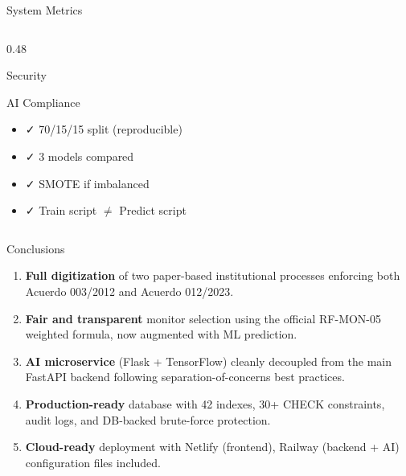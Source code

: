 \documentclass[aspectratio=169,12pt]{beamer}
\begin{document}
\begin{frame}{System Metrics}
\begin{columns}[T]
\begin{column}{0.48\textwidth}
\begin{block}{Security}
\begin{itemize}
        \end{itemize}
      \end{block}
      \vspace{0.2cm}
      \begin{block}{AI Compliance}
        \footnotesize
        \begin{itemize}
          \item ✓ 70/15/15 split (reproducible)
          \item ✓ 3 models compared
          \item ✓ SMOTE if imbalanced
          \item ✓ Train script $\neq$ Predict script
        \end{itemize}
      \end{block}
    \end{column}
  \end{columns}
\end{frame}

\begin{frame}{Conclusions}
  \begin{enumerate}
    \item \textbf{Full digitization} of two paper-based institutional processes enforcing both Acuerdo 003/2012 and Acuerdo 012/2023.
    \vspace{0.2cm}
    \item \textbf{Fair and transparent} monitor selection using the official RF-MON-05 weighted formula, now augmented with ML prediction.
    \vspace{0.2cm}
    \item \textbf{AI microservice} (Flask + TensorFlow) cleanly decoupled from the main FastAPI backend following separation-of-concerns best practices.
    \vspace{0.2cm}
    \item \textbf{Production-ready} database with 42 indexes, 30+ CHECK constraints, audit logs, and DB-backed brute-force protection.
    \vspace{0.2cm}
    \item \textbf{Cloud-ready} deployment with Netlify (frontend), Railway (backend + AI) configuration files included.
  \end{enumerate}
\end{frame}
\end{document}
